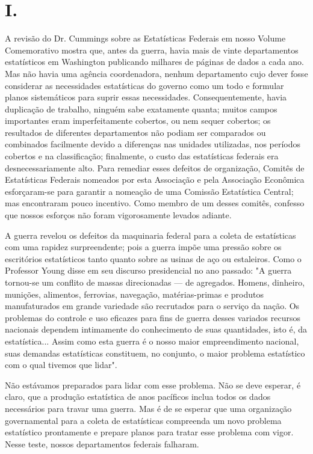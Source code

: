 \documentclass[12pt]{article}
\begin{document}
\section*{I.}

A revisão do Dr. Cummings sobre as Estatísticas Federais em nosso Volume Comemorativo mostra que, antes da guerra, havia mais de vinte departamentos estatísticos em Washington publicando milhares de páginas de dados a cada ano. Mas não havia uma agência coordenadora, nenhum departamento cujo dever fosse considerar as necessidades estatísticas do governo como um todo e formular planos sistemáticos para suprir essas necessidades. Consequentemente, havia duplicação de trabalho, ninguém sabe exatamente quanta; muitos campos importantes eram imperfeitamente cobertos, ou nem sequer cobertos; os resultados de diferentes departamentos não podiam ser comparados ou combinados facilmente devido a diferenças nas unidades utilizadas, nos períodos cobertos e na classificação; finalmente, o custo das estatísticas federais era desnecessariamente alto. Para remediar esses defeitos de organização, Comitês de Estatísticas Federais nomeados por esta Associação e pela Associação Econômica esforçaram-se para garantir a nomeação de uma Comissão Estatística Central; mas encontraram pouco incentivo. Como membro de um desses comitês, confesso que nossos esforços não foram vigorosamente levados adiante.

A guerra revelou os defeitos da maquinaria federal para a coleta de estatísticas com uma rapidez surpreendente; pois a guerra impõe uma pressão sobre os escritórios estatísticos tanto quanto sobre as usinas de aço ou estaleiros. Como o Professor Young disse em seu discurso presidencial no ano passado: "A guerra tornou-se um conflito de massas direcionadas — de agregados. Homens, dinheiro, munições, alimentos, ferrovias, navegação, matérias-primas e produtos manufaturados em grande variedade são recrutados para o serviço da nação. Os problemas do controle e uso eficazes para fins de guerra desses variados recursos nacionais dependem intimamente do conhecimento de suas quantidades, isto é, da estatística... Assim como esta guerra é o nosso maior empreendimento nacional, suas demandas estatísticas constituem, no conjunto, o maior problema estatístico com o qual tivemos que lidar".

Não estávamos preparados para lidar com esse problema. Não se deve esperar, é claro, que a produção estatística de anos pacíficos inclua todos os dados necessários para travar uma guerra. Mas é de se esperar que uma organização governamental para a coleta de estatísticas compreenda um novo problema estatístico prontamente e prepare planos para tratar esse problema com vigor. Nesse teste, nossos departamentos federais falharam.
\end{document}
